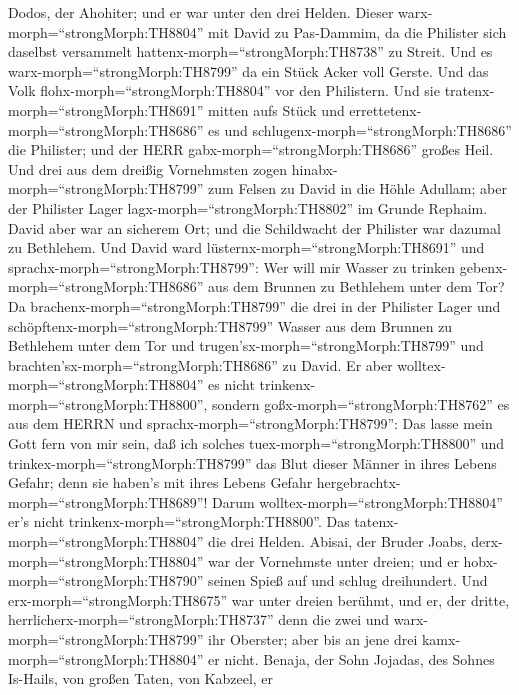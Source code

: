 Dodos, der Ahohiter; und er war unter den drei Helden. 
Dieser warx-morph=``strongMorph:TH8804'' mit David zu Pas-Dammim, da die
Philister sich daselbst versammelt hattenx-morph=``strongMorph:TH8738''
zu Streit. Und es warx-morph=``strongMorph:TH8799'' da ein Stück Acker
voll Gerste. Und das Volk flohx-morph=``strongMorph:TH8804'' vor den
Philistern.  Und sie tratenx-morph=``strongMorph:TH8691''
mitten aufs Stück und errettetenx-morph=``strongMorph:TH8686'' es und
schlugenx-morph=``strongMorph:TH8686'' die Philister; und der HERR
gabx-morph=``strongMorph:TH8686'' großes Heil.  Und drei
aus dem dreißig Vornehmsten zogen hinabx-morph=``strongMorph:TH8799''
zum Felsen zu David in die Höhle Adullam; aber der Philister Lager
lagx-morph=``strongMorph:TH8802'' im Grunde Rephaim.  David
aber war an sicherem Ort; und die Schildwacht der Philister war dazumal
zu Bethlehem.  Und David ward
lüsternx-morph=``strongMorph:TH8691'' und
sprachx-morph=``strongMorph:TH8799'': Wer will mir Wasser zu trinken
gebenx-morph=``strongMorph:TH8686'' aus dem Brunnen zu Bethlehem unter
dem Tor?  Da brachenx-morph=``strongMorph:TH8799'' die drei
in der Philister Lager und schöpftenx-morph=``strongMorph:TH8799''
Wasser aus dem Brunnen zu Bethlehem unter dem Tor und
trugen'sx-morph=``strongMorph:TH8799'' und
brachten'sx-morph=``strongMorph:TH8686'' zu David. Er aber
wolltex-morph=``strongMorph:TH8804'' es nicht
trinkenx-morph=``strongMorph:TH8800'', sondern
goßx-morph=``strongMorph:TH8762'' es aus dem HERRN  und
sprachx-morph=``strongMorph:TH8799'': Das lasse mein Gott fern von mir
sein, daß ich solches tuex-morph=``strongMorph:TH8800'' und
trinkex-morph=``strongMorph:TH8799'' das Blut dieser Männer in ihres
Lebens Gefahr; denn sie haben's mit ihres Lebens Gefahr
hergebrachtx-morph=``strongMorph:TH8689''! Darum
wolltex-morph=``strongMorph:TH8804'' er's nicht
trinkenx-morph=``strongMorph:TH8800''. Das
tatenx-morph=``strongMorph:TH8804'' die drei Helden. 
Abisai, der Bruder Joabs, derx-morph=``strongMorph:TH8804'' war der
Vornehmste unter dreien; und er hobx-morph=``strongMorph:TH8790'' seinen
Spieß auf und schlug dreihundert. Und erx-morph=``strongMorph:TH8675''
war unter dreien berühmt,  und er, der dritte,
herrlicherx-morph=``strongMorph:TH8737'' denn die zwei und
warx-morph=``strongMorph:TH8799'' ihr Oberster; aber bis an jene drei
kamx-morph=``strongMorph:TH8804'' er nicht.  Benaja, der
Sohn Jojadas, des Sohnes Is-Hails, von großen Taten, von Kabzeel, er
